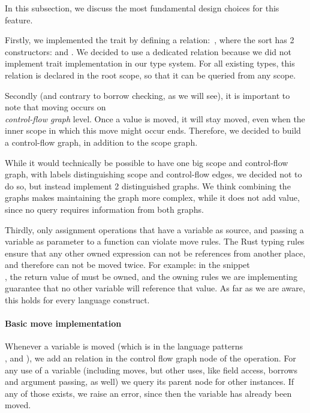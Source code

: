 In this subsection, we discuss the most fundamental design choices for this feature. 

Firstly, we implemented the  trait by defining a relation:\ , where the sort  has 2 constructors:  and . We decided to use a dedicated relation because we did not implement trait implementation in our type system. For all existing types, this relation is declared in the root scope, so that it can be queried from any scope.

Secondly (and contrary to borrow checking, as we will see), it is important to note that moving occurs on\\ \textit{control-flow graph} level. Once a value is moved, it will stay moved, even when the inner scope in which this move might occur ends. Therefore, we decided to build a control-flow graph, in addition to the scope graph.

While it would technically be possible to have one big scope and control-flow graph, with labels distinguishing scope and control-flow edges, we decided not to do so, but instead implement 2 distinguished graphs. We think combining the graphs makes maintaining the graph more complex, while it does not add value, since no query requires information from both graphs.

Thirdly, only assignment operations that have a variable as source, and passing a variable as parameter to a function can violate move rules. The Rust typing rules ensure that any other owned expression can not be references from another place, and therefore can not be moved twice. For example: in the snippet\\ , the return value of  must be owned, and the owning rules we are implementing guarantee that no other variable will reference that value. As far as we are aware, this holds for every language construct. 

\paragraph{Basic move implementation}

Whenever a variable is moved (which is in the language patterns \\ ,  and ), we add an relation  in the control flow graph node of the operation. For any use of a variable (including moves, but other uses, like field access, borrows and argument passing, as well) we query its parent node for other  instances. If any of those exists, we raise an error, since then the variable has already been moved.

